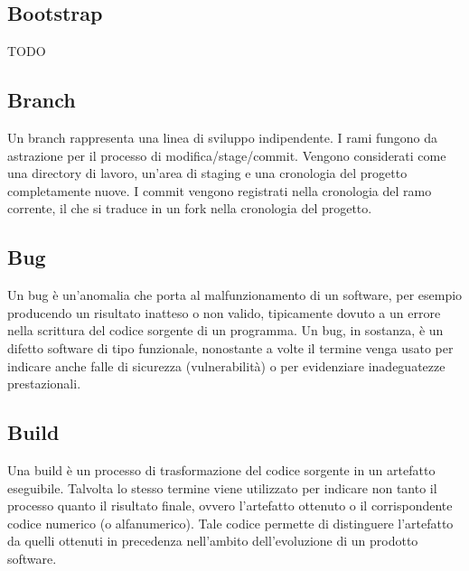 \vspace{2em}
\subsection*{Bootstrap}
TODO

\vspace{2em}
\subsection*{Branch}
Un branch rappresenta una linea di sviluppo indipendente. I rami fungono da astrazione per il processo di modifica/stage/commit. Vengono considerati come una directory di lavoro, un'area di staging e una cronologia del progetto completamente nuove. I commit vengono registrati nella cronologia del ramo corrente, il che si traduce in un fork nella cronologia del progetto.

\vspace{2em}
\subsection*{Bug}
Un bug è un'anomalia che porta al malfunzionamento di un software, per esempio producendo un risultato inatteso o non valido, tipicamente dovuto a un errore nella scrittura del codice sorgente di un programma. Un bug, in sostanza, è un difetto software di tipo funzionale, nonostante a volte il termine venga usato per indicare anche falle di sicurezza (vulnerabilità) o per evidenziare inadeguatezze prestazionali.

\vspace{2em}
\subsection*{Build}
Una build è un processo di trasformazione del codice sorgente in un artefatto eseguibile. Talvolta lo stesso termine viene utilizzato per indicare non tanto il processo quanto il risultato finale, ovvero l'artefatto ottenuto o il corrispondente codice numerico (o alfanumerico). Tale codice permette di distinguere l'artefatto da quelli ottenuti in precedenza nell'ambito dell'evoluzione di un prodotto software.
